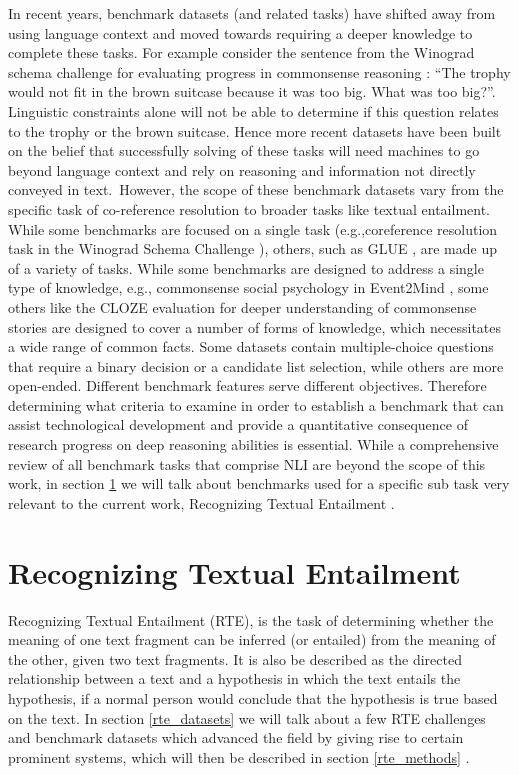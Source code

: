 In recent years, benchmark datasets (and related tasks) have shifted away from using language context and moved towards requiring a deeper knowledge to complete these tasks. For example consider the sentence from the Winograd schema challenge for evaluating progress in commonsense reasoning 
\citep{morgenstern2015winograd}: “The trophy would not fit in the brown suitcase because it was too big. What was too big?”.
Linguistic constraints alone will not be able to determine if this question relates to the trophy or the brown suitcase. Hence more recent datasets have been built on the belief that successfully solving of these tasks will need machines to go beyond language context and rely on reasoning and information not directly conveyed in text. However, the scope of these benchmark datasets vary from the specific task of co-reference resolution to broader tasks like textual entailment. 
While some benchmarks are focused on a single task (e.g.,coreference resolution task in the Winograd Schema Challenge \citep{morgenstern2015winograd}), others, such as GLUE \citep{wang2018glue}, are made up of a variety of tasks. While some benchmarks are designed to address a single type of knowledge, e.g., commonsense social psychology in Event2Mind  \citep{rashkin2018event2mind}, some others like the CLOZE evaluation for deeper understanding of commonsense stories \citep{mostafazadeh2016corpus} are designed to cover a number of forms of knowledge, which necessitates a wide range of common facts. Some datasets contain multiple-choice questions that require a binary decision or a candidate list selection, while others are more open-ended. Different benchmark features serve different objectives. Therefore determining what criteria to examine in order to establish a benchmark that can assist technological development and provide a quantitative consequence of research progress on deep reasoning abilities is essential. While a comprehensive review of all benchmark tasks that comprise NLI are beyond the scope of this work, in section \ref{sec-rte} we will talk about benchmarks used for a specific sub task very relevant to the current work, Recognizing Textual Entailment \citep{dagan2013recognizing}.

\section{Recognizing Textual Entailment}
\label{sec-rte}


Recognizing Textual Entailment  \citep{dagan2013recognizing} (RTE),  is the task of determining whether the meaning of one text fragment can be inferred (or entailed) from the meaning of the other, given two text fragments. It is also be described as the directed relationship between a text and a hypothesis in which the text entails the hypothesis, if a normal person would conclude that the hypothesis is true based on the text. In section \ref{rte_datasets} we will talk about a few RTE challenges and benchmark datasets which advanced the field by giving rise to certain prominent systems, which will then be described in section \ref{rte_methods} . 

